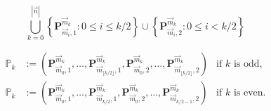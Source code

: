 \documentclass[10pt,a4paper]{amsart}
\begin{document}
    \begin{equation}
        \label{eq:basis-MOP}
        \bigcup_{k=0}^{|\vec n|}\left\{\mathbf P_{\vec m_i,1}^{\vec m_k}: 0\leq i\leq k/2\right\}\cup\left\{\mathbf P_{\vec m_i,2}^{\vec m_k}: 0\leq i< k/2\right\}
    \end{equation}

    \begin{equation}
    \label{eq:polynomial-vector-MOP}
    \begin{aligned}
        \mathbb P_{k} &:= \left(\mathbf P_{\vec m_0,1}^{\vec m_k},\dots,\mathbf P_{\vec m_{\lfloor k/2\rfloor },1}^{\vec m_k},\mathbf P_{\vec m_0,2}^{\vec m_k},\dots,\mathbf P_{\vec m_{\lfloor k/2\rfloor},2}^{\vec m_k}\right)& \text{if }k\text{ is odd,}\\
        \mathbb P_{k} &:= \left(\mathbf P_{\vec m_0,1}^{\vec m_k},\dots,\mathbf P_{\vec m_{k/2},1}^{\vec m_k},\mathbf P_{\vec m_0,2}^{\vec m_k},\dots,\mathbf P_{\vec m_{k/2-1},2}^{\vec m_k}\right)& \text{if }k\text{ is even.}
    \end{aligned}
    \end{equation}
\end{document}
